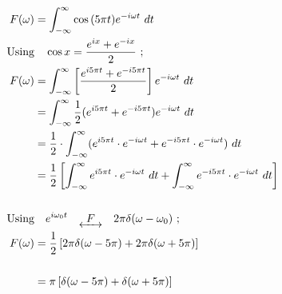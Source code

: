 \documentclass[preview]{standalone}
\begin{document}
\begin{align*}
F(\omega)&=\int_{-\infty}^{\infty} \cos{(5\pi t)} e^{-i\omega t} \ dt \\ \textrm{Using}& \quad \cos{x}=\frac{e^{ix}+e^{-ix}}{2} \ ; \\ F(\omega)&=\int_{-\infty}^{\infty}\left[ \frac{e^{i5\pi t}+e^{-i5\pi t}}{2}\right] e^{-i\omega t} \ dt \\ &=\int_{-\infty}^{\infty} \frac{1}{2} (e^{i5\pi t}+e^{-i5\pi t})e^{-i\omega t} \ dt \\ &=\frac{1}{2}\cdot \int_{-\infty}^{\infty}(e^{i5\pi t}\cdot e^{-i\omega t}+e^{-i5\pi t}\cdot e^{-i\omega t}) \ dt \\ &=\frac{1}{2}\left[ \int_{-\infty}^{\infty}e^{i5\pi t}\cdot e^{-i\omega t} \ dt+\int_{-\infty}^{\infty} e^{-i5\pi t}\cdot e^{-i\omega t} \ dt \right] \\ \\ \textrm{Using}& \quad e^{i\omega_{0} t} \quad \underleftrightarrow{ \ \ F \ \ } \quad 2\pi \delta(\omega - \omega_{0}) \ ; \\ F(\omega)&=\frac{1}{2}\left[ 2\pi \delta(\omega-5\pi)+2\pi\delta(\omega+5\pi) \right] \\ \\ &=\pi\left[\delta(\omega-5\pi)+\delta(\omega+5\pi)\right]
\end{align*}
\end{document}
